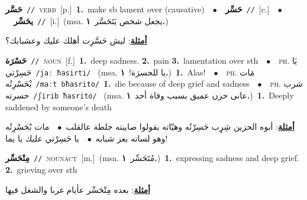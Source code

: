 \documentclass[10pt,a4paper,twoside]{article} %
\begin{document}
\begin{multicols}{2}
{\setlength\topsep{0pt}\textbf{\foreignlanguage{arabic}{حَسَّر}}\ {\color{gray}\texttt{//}\color{black}}\ \textsc{verb}\ [p.]\ \textbf{1.}~make sb lament over (causative)\ \ $\bullet$\ \ \setlength\topsep{0pt}\textbf{\foreignlanguage{arabic}{حَسِّر}}\ {\color{gray}\texttt{//}\color{black}}\ [c.]\ \ $\bullet$\ \ \setlength\topsep{0pt}\textbf{\foreignlanguage{arabic}{يحَسِّر}}\ {\color{gray}\texttt{//}\color{black}}\ [i.]\ \color{gray}(msa. \foreignlanguage{arabic}{يجعل شخص يَتَحَسَّر}~\foreignlanguage{arabic}{\textbf{١.}})\color{black}\  \begin{flushright}\color{gray}\foreignlanguage{arabic}{\textbf{\underline{\foreignlanguage{arabic}{أمثلة}}}: ليش حَسَّرِت أهلك عليك وعشبابك؟}\end{flushright}\color{black}} \vspace{2mm}

{\setlength\topsep{0pt}\textbf{\foreignlanguage{arabic}{حَسْرَة}}\ {\color{gray}\texttt{//}\color{black}}\ \textsc{noun}\ [f.]\ \textbf{1.}~deep sadness.  \textbf{2.}~pain  \textbf{3.}~lamentation over sth\ \ $\bullet$\ \ \textsc{ph.} \color{gray} \foreignlanguage{arabic}{يَا حَسِرْتي}\color{black}\ {\color{gray}\texttt{/{\sffamily jaː ħasirti}/}\color{black}}\ \color{gray} (msa. \foreignlanguage{arabic}{يا للحسرَة!}~\foreignlanguage{arabic}{\textbf{١.}})\color{black}\ \textbf{1.}~Alas!\ \ $\bullet$\ \ \textsc{ph.} \color{gray} \foreignlanguage{arabic}{مَات بْحَسْرِتُه}\color{black}\ {\color{gray}\texttt{/{\sffamily maːt bħasrito}/}\color{black}}\ \textbf{1.}~die because of deep grief and sadness\ \ $\bullet$\ \ \textsc{ph.} \color{gray} \foreignlanguage{arabic}{شرب حسرته}\color{black}\ {\color{gray}\texttt{/{\sffamily ʃirib ħasrito}/}\color{black}}\ \color{gray} (msa. \foreignlanguage{arabic}{عانى حزن عميق بسبب وفاة أحد}~\foreignlanguage{arabic}{\textbf{١.}})\color{black}\ \textbf{1.}~Deeply saddened by someone's death\  \begin{flushright}\color{gray}\foreignlanguage{arabic}{\textbf{\underline{\foreignlanguage{arabic}{أمثلة}}}: أبوه الحزين شِرِِب حَسِرْتُه وهيّاته بقولوا صايبته جلطة عالقلب\ $\bullet$\ \  مات بْحَسْرِتُه وهو لساته بعز شبابه\ $\bullet$\ \  يا حَسِرْتي عليك يا يما!}\end{flushright}\color{black}} \vspace{2mm}

{\setlength\topsep{0pt}\textbf{\foreignlanguage{arabic}{مِتْحَسِّر}}\ {\color{gray}\texttt{//}\color{black}}\ \textsc{noun\textunderscore act}\ [m.]\ \color{gray}(msa. \foreignlanguage{arabic}{مُتَحَسِّر}~\foreignlanguage{arabic}{\textbf{١.}})\color{black}\ \textbf{1.}~expressing sadness and deep grief.  \textbf{2.}~grieving over sth\  \begin{flushright}\color{gray}\foreignlanguage{arabic}{\textbf{\underline{\foreignlanguage{arabic}{أمثلة}}}: بعده مِتْحَسِّر عأيام غربا والشغل فيها}\end{flushright}\color{black}} \vspace{2mm}


\end{multicols}
\end{document}
